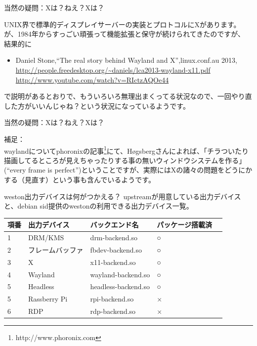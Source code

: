 \begin{frame}{当然の疑問：Xは？ねえ？Xは？}

 UNIX界で標準的ディスプレイサーバーの実装とプロトコルにXがあります。
が、1984年からすっごい頑張って機能拡張と保守が続けられてきたのですが、
結果的に
\begin{itemize}

\item Daniel Stone,``The real story behind Wayland and X'',linux.conf.au 2013,\\
\url{http://people.freedesktop.org/~daniels/lca2013-wayland-x11.pdf}\\
\url{http://www.youtube.com/watch?v=RIctzAQOe44}
\end{itemize}
で説明があるとおりで、もういろいろ無理出まくってる状況なので、一回やり直した方がいいんじゃね？という状況になっているようです。

\end{frame}


\begin{frame}{当然の疑問：Xは？ねえ？Xは？}

補足：\\
waylandについてphoronixの記事\footnote{http://www.phoronix.com}にて、H\o{}gsbergさんによれば、「チラついたり描画してるところが見えちゃったりする事の無いウィンドウシステムを作る」(``every frame is perfect'')ということですが、実際にはXの諸々の問題をどうにかする（見直す）という事も含んでいるようです。

\end{frame}


\begin{frame}{weston出力デバイスは何がつかえる？}
upstreamが用意している出力デバイスと、debian sid提供のwestonの利用できる出力デバイス一覧。
\begin{table}[ht]
\begin{center}
\small
\begin{tabular}{|l|l|l|l|l|}
\hline 
項番&出力デバイス&バックエンド名&パッケージ搭載済\\
\hline \hline
1& DRM/KMS & drm-backend.so & ○ \\
2& フレームバッファ & fbdev-backend.so & ○ \\
3& X & x11-backend.so & ○ \\
4& Wayland & wayland-backend.so & ○ \\
5& Headless & headless-backend.so & ○ \\
5& Rassberry Pi & rpi-backend.so & × \\
6& RDP & rdp-backend.so & × \\
\hline
\end{tabular}
\end{center}
\end{table}

\end{frame}

